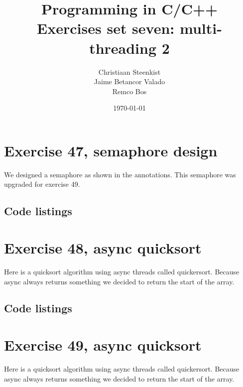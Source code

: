 \documentclass[11pt]{article}
\begin{document}
\title{Programming in C/C++ \\
       Exercises set seven: multi-threading 2
}
\date{\today}
\author{Christiaan Steenkist \\
Jaime Betancor Valado \\
Remco Bos \\
}

\maketitle
\section*{Exercise 47, semaphore design}
We designed a semaphore as shown in the annotations.
This semaphore was upgraded for exercise 49.

\subsection*{Code listings}









\section*{Exercise 48, async quicksort}
Here is a quicksort algorithm using async threads called quickersort.
Because async always returns something we decided to return the start of the array.

\subsection*{Code listings}





\section*{Exercise 49, async quicksort}
Here is a quicksort algorithm using async threads called quickersort.
Because async always returns something we decided to return the start of the array.
\end{document}
